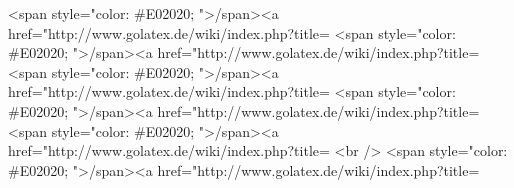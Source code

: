 <span style="color: #E02020; ">\</span><a href="http://www.golatex.de/wiki/index.php?title=%
<span style="color: #E02020; ">\</span><a href="http://www.golatex.de/wiki/index.php?title=%
<span style="color: #E02020; ">\</span><a href="http://www.golatex.de/wiki/index.php?title=%
<span style="color: #E02020; ">\</span><a href="http://www.golatex.de/wiki/index.php?title=%
<span style="color: #E02020; ">\</span><a href="http://www.golatex.de/wiki/index.php?title=%
<br />
<span style="color: #E02020; ">\</span><a href="http://www.golatex.de/wiki/index.php?title=%
